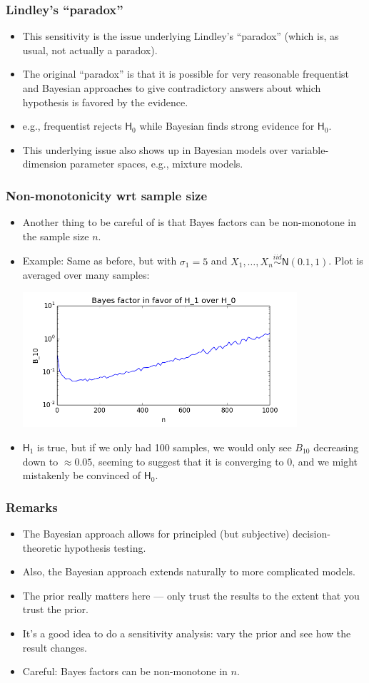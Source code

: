 \documentclass[handout]{beamer}
\def\N{\textsf{N}}
\def\iid{\stackrel{iid}{\sim}}
\def\H{\textsf{H}}
\begin{document}
\begin{frame}
\frametitle{Lindley's ``paradox''}
\begin{itemize}
\item This sensitivity is the issue underlying Lindley's ``paradox'' (which is, as usual, not actually a paradox).
\item The original ``paradox'' is that it is possible for very reasonable frequentist and Bayesian approaches to give contradictory answers about which hypothesis is favored by the evidence.
\item e.g., frequentist rejects $\H_0$ while Bayesian finds strong evidence for $\H_0$.
\item This underlying issue also shows up in Bayesian models over variable-dimension parameter spaces, e.g., mixture models.
\end{itemize}
\end{frame}


\begin{frame}
\frametitle{Non-monotonicity wrt sample size}
\begin{itemize}
\item Another thing to be careful of is that Bayes factors can be non-monotone in the sample size $n$.
\item Example: Same as before, but with $\sigma_1 = 5$ and $X_1,\dotsc,X_n\iid \N(0.1,1)$. Plot is averaged over many samples:
\centerline{\includegraphics[width=0.8\textwidth]{non-monotone.png}}
\item $\H_1$ is true, but if we only had 100 samples, we would only see $B_{10}$ decreasing down to $\approx 0.05$, seeming to suggest that it is converging to $0$, and we might mistakenly be convinced of $\H_0$.
\end{itemize}
\end{frame}


\begin{frame}
\frametitle{Remarks}
\begin{itemize}
\item The Bayesian approach allows for principled (but subjective) decision-theoretic hypothesis testing.
\item Also, the Bayesian approach extends naturally to more complicated models.
\item The prior really matters here --- only trust the results to the extent that you trust the prior.
\item It's a good idea to do a sensitivity analysis: vary the prior and see how the result changes.
\item Careful: Bayes factors can be non-monotone in $n$.
\end{itemize}
\end{frame}
\end{document}
